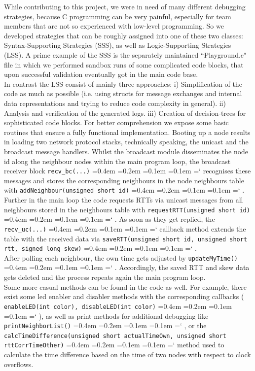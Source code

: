 \documentclass{llncs}
\newcommand{\code}[1]{%
	\texttt{#1}%
	\fontdimen2\font=0.4em
	\fontdimen3\font=0.2em
	\fontdimen4\font=0.1em
	\fontdimen7\font=0.1em
	\hyphenchar\font=`\-
}
\begin{document}
\noindent While contributing to this project, we were in need of many different debugging strategies, because C programming can be very painful, especially for team members that are not so experienced with low-level programming.
So we developed strategies that can be roughly assigned into one of these two classes: Syntax-Supporting Strategies (SSS), as well as Logic-Supporting Strategies (LSS). 
A prime example of the SSS is the separately maintained ``Playground.c" file in which we performed sandbox runs of some complicated code blocks, that upon successful validation eventually got in the main code base.\\
In contrast the LSS consist of mainly three approaches: i) Simplification of the code as much as possible (i.e. using structs for message exchanges and internal data representations and trying to reduce code complexity in general). ii) Analysis and verification of the generated logs. iii) Creation of decision-trees for sophisticated code blocks.\bigbreak
\noindent For better comprehension we expose some basic routines that ensure a fully functional implementation. Booting up a node results in loading two network protocol stacks, technically speaking, the unicast and the broadcast message handlers. Whilst the broadcast module disseminates the node id along the neighbour nodes within the main program loop, the broadcast receiver block \code{recv\_bc(...)} recognises these messages and stores the corresponding neighbours in the node neighbours table with \code{addNeighbour(unsigned short id)}. Further in the main loop the code requests RTTs via unicast messages from all neighbours stored in the neighbours table with \code{requestRTT(unsigned short id)}. As soon as they get replied, the \code{recv\_uc(...)} callback method extends the table with the received data via \code{saveRTT(unsigned short id, unsigned short rtt, signed long skew)}.\\
After polling each neighbour, the own time gets adjusted by \code{updateMyTime()}. Accordingly, the saved RTT and skew data gets deleted and the process repeats again the main program loop.\\
Some more casual methods can be found in the code as well. For example, there exist some led enabler and disabler methods with the corresponding callbacks (\code{enableLED(int color), disableLED(int color)}), as well as print methods for additional debugging like \code{print\-Neighbor\-List()}, or the \code{calcTimeDifference(unsigned short actualTime\-Own, unsigned short rttCorrTimeOther)} method used to calculate the time difference based on the time of two nodes with respect to clock overflows.
\newpage
\end{document}
